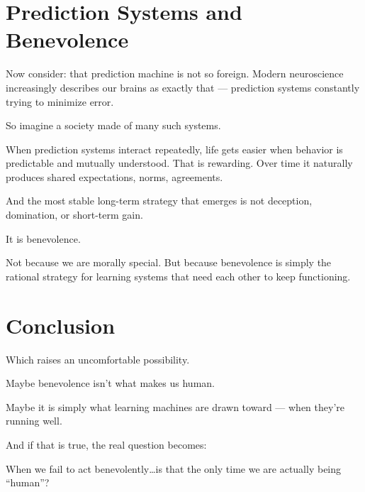 \documentclass{article}
\begin{document}
\section*{Prediction Systems and Benevolence}

Now consider: that prediction machine is not so foreign. Modern neuroscience increasingly describes our brains as exactly that --- prediction systems constantly trying to minimize error.

So imagine a society made of many such systems.

When prediction systems interact repeatedly, life gets easier when behavior is predictable and mutually understood. That is rewarding. Over time it naturally produces shared expectations, norms, agreements.

And the most stable long-term strategy that emerges is not deception, domination, or short-term gain.

It is benevolence.

Not because we are morally special. But because benevolence is simply the rational strategy for learning systems that need each other to keep functioning.

\section*{Conclusion}

Which raises an uncomfortable possibility.

Maybe benevolence isn't what makes us human.

Maybe it is simply what learning machines are drawn toward --- when they're running well.

And if that is true, the real question becomes:

When we fail to act benevolently\ldots is that the only time we are actually being ``human''?
\end{document}
